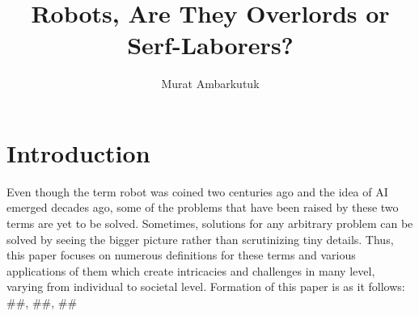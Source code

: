 \documentclass[man]{apa6}
\title{Robots, Are They Overlords or Serf-Laborers?}
\author{Murat Ambarkutuk}
\affiliation{English Language Institute, University of Delaware \\ murata@udel.edu}
\begin{document}
\maketitle
\section{Introduction}
Even though the term robot was coined two centuries ago and the idea of AI emerged decades ago, some of the problems that have been raised by these two terms are yet to be solved. Sometimes, solutions for any arbitrary problem can be solved by seeing the bigger picture rather than scrutinizing tiny details. Thus, this paper focuses on numerous definitions for these terms and various applications of them which create intricacies and challenges in many level, varying from individual to societal level. Formation of this paper is as it follows: \#\#, \#\#, \#\#
\end{document}
